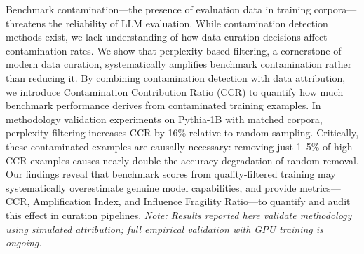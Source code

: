 Benchmark contamination---the presence of evaluation data in training corpora---threatens the reliability of LLM evaluation. While contamination detection methods exist, we lack understanding of how data curation decisions affect contamination rates. We show that perplexity-based filtering, a cornerstone of modern data curation, systematically amplifies benchmark contamination rather than reducing it. By combining contamination detection with data attribution, we introduce Contamination Contribution Ratio (CCR) to quantify how much benchmark performance derives from contaminated training examples. In methodology validation experiments on Pythia-1B with matched corpora, perplexity filtering increases CCR by 16\% relative to random sampling. Critically, these contaminated examples are causally necessary: removing just 1--5\% of high-CCR examples causes nearly double the accuracy degradation of random removal. Our findings reveal that benchmark scores from quality-filtered training may systematically overestimate genuine model capabilities, and provide metrics---CCR, Amplification Index, and Influence Fragility Ratio---to quantify and audit this effect in curation pipelines. \textit{Note: Results reported here validate methodology using simulated attribution; full empirical validation with GPU training is ongoing.}
